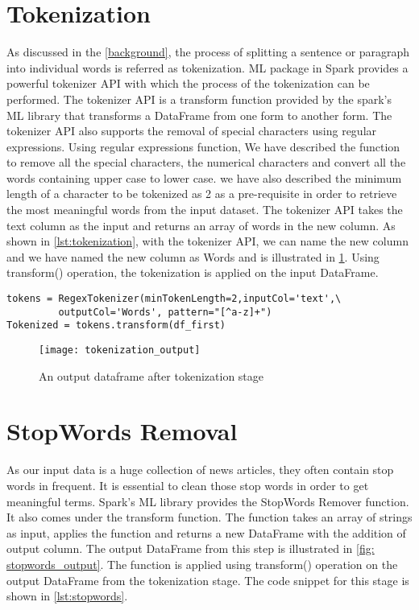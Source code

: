 \section{Tokenization}
As discussed in the \ref{background}, the process of splitting a sentence or paragraph into individual words is referred as tokenization. ML package in Spark provides a powerful tokenizer API with which the process of the  tokenization can be performed. The tokenizer API is a transform function provided by the spark's ML library that transforms a DataFrame from one form to another form. The tokenizer API also supports the removal of special characters using regular expressions. Using regular expressions function, We have described the function to remove all the special characters, the numerical characters and convert all the words containing upper case to lower case. we have also described the minimum length of a character to be tokenized as 2 as a pre-requisite in order to retrieve the most meaningful words from the input dataset. The tokenizer API takes the text column as the input and returns an array of words in the new column. As shown in \ref{lst:tokenization}, with the tokenizer API, we can name the new column and we have named the new column as Words and is illustrated in \ref{fig: tokenization_output}. Using transform() operation, the tokenization is applied on the input DataFrame.

\begin{lstlisting}[style=Java,float=htb,caption={Python code for tokenization},label={lst:tokenization}]
tokens = RegexTokenizer(minTokenLength=2,inputCol='text',\
		 outputCol='Words', pattern="[^a-z]+") 
Tokenized = tokens.transform(df_first)
\end{lstlisting}

\begin{figure}[htbp]
	\centering
		\texttt{[image: tokenization\_output]}
	\caption{An output dataframe after tokenization stage }
	\label{fig: tokenization_output}
\end{figure}

\section{StopWords Removal}
As our input data is a huge collection of news articles, they often contain stop words in frequent. It is essential to clean those stop words in order to get meaningful terms. Spark's ML library provides the StopWords Remover function. It also comes under the transform function. The function takes an array of strings as input, applies the function and returns a new DataFrame with the addition of output column. The output DataFrame from this step is illustrated in \ref{fig: stopwords_output}.  The function is applied using transform() operation on the output DataFrame from the tokenization stage. The code snippet for this stage is shown in \ref{lst:stopwords}.

